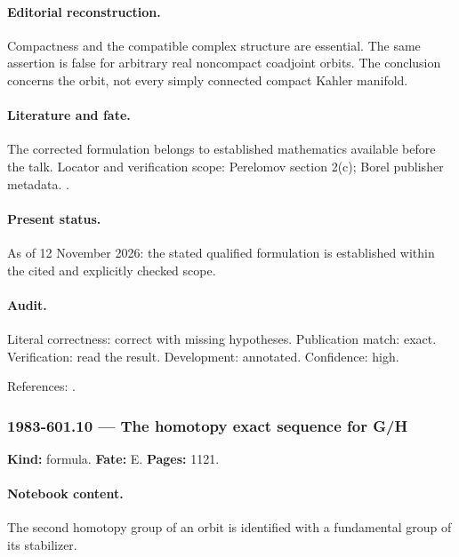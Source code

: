 \paragraph{Editorial reconstruction.} Compactness and the compatible complex structure are essential. The same assertion is false for arbitrary real noncompact coadjoint orbits. The conclusion concerns the orbit, not every simply connected compact Kahler manifold.

\paragraph{Literature and fate.} The corrected formulation belongs to established mathematics available before the talk. Locator and verification scope: Perelomov section 2(c); Borel publisher metadata. \cite{borel1954kahler,perelomov1981instantons}.

\paragraph{Present status.} As of 12 November 2026: the stated qualified formulation is established within the cited and explicitly checked scope.

\paragraph{Audit.} Literal correctness: correct with missing hypotheses. Publication match: exact. Verification: read the result. Development: annotated. Confidence: high.

\noindent References: \citep{borel1954kahler,perelomov1981instantons}.\par

\subsubsection{1983-601.10 --- The homotopy exact sequence for G/H}

\label{item:1983-601.10}

\noindent\textbf{Kind:} formula. \textbf{Fate:} E. \textbf{Pages:} 1121.\par

\paragraph{Notebook content.} The second homotopy group of an orbit is identified with a fundamental group of its stabilizer.

